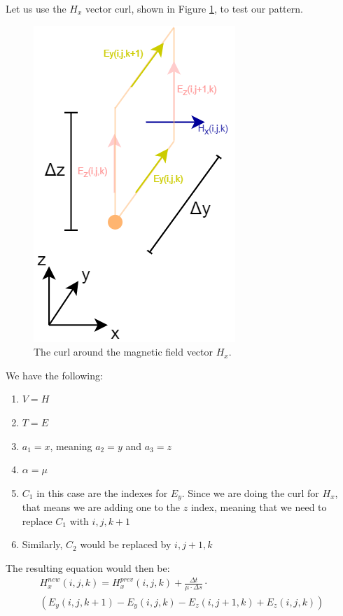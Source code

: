 Let us use the $H_x$ vector curl, shown in Figure \ref{fig:fdtd3dHxCurl}, to test our pattern.

\begin{figure}[h!]
	\centering
	\includegraphics[scale=0.6]{Figures/fdtd3dHxCurl}
	\decoRule
	\caption[3D $H_x$ vector curl]{The curl around the magnetic field vector $H_x$.}
	\label{fig:fdtd3dHxCurl}
\end{figure}

We have the following:

\begin{enumerate}
	\item $V = H$
	\item $T = E$
	\item $a_1 = x$, meaning $a_2 = y$ and $a_3 = z$
	\item $\alpha = \mu$
	\item $C_1$ in this case are the indexes for $E_y$. Since we are doing the curl for $H_x$, that means we are adding one to the $z$ index, meaning that we need to replace $C_1$ with $i,j,k+1$
	\item Similarly, $C_2$ would be replaced by $i,j+1,k$\\
\end{enumerate}

The resulting equation would then be:
\begin{multline}
	\label{eqn:3dHxPatternFinal}
	H_x^{new}(i,j,k) =  H_x^{prev}(i,j,k) + \frac{\Delta t}{\mu \cdot \Delta s} \cdot \\ (E_y(i,j,k+1) - E_y(i,j,k) - E_z(i,j+1,k) + E_z(i,j,k))
\end{multline}

